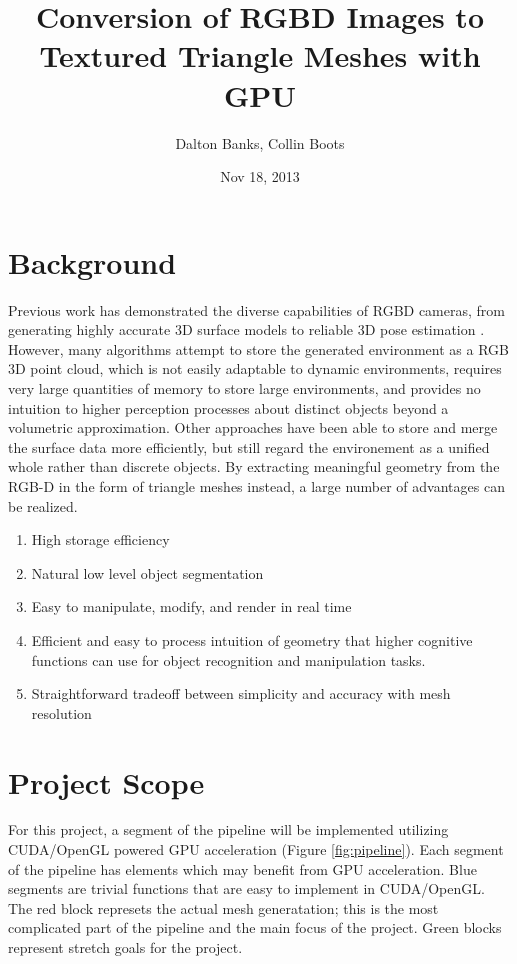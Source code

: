 \documentclass[letterpaper, 10 pt, conference]{ieeeconf}
\title{Conversion of RGBD Images to Textured Triangle Meshes with GPU}
\author{Dalton Banks, Collin Boots}
\date{Nov 18, 2013}
\begin{document}
   \maketitle


\section{Background} 
Previous work has demonstrated the diverse capabilities of RGBD cameras, from generating highly accurate 3D surface models \cite{KinectFusion} to reliable 3D pose estimation \cite{Endres,Taguchi}. However, many algorithms attempt to store the generated environment as a RGB 3D point cloud, which is not easily adaptable to dynamic environments, requires very large quantities of memory to store large environments, and provides no intuition to higher perception processes about distinct objects beyond a volumetric approximation. Other approaches have been able to store and merge the surface data more efficiently, but still regard the environement as a unified whole rather than discrete objects. By extracting meaningful geometry from the RGB-D in the form of triangle meshes instead, a large number of advantages can be realized.

\begin{enumerate}
\item High storage efficiency
\item Natural low level object segmentation
\item Easy to manipulate, modify, and render in real time
\item Efficient and easy to process intuition of geometry that higher cognitive functions can use for object recognition and manipulation tasks.
\item Straightforward tradeoff between simplicity and accuracy with mesh resolution
\end{enumerate}

\section{Project Scope}
For this project, a segment of the pipeline will be implemented utilizing CUDA/OpenGL powered GPU acceleration (Figure \ref{fig:pipeline}).  Each segment of the pipeline has elements which may benefit from GPU acceleration. Blue segments are trivial functions that are easy to implement in CUDA/OpenGL. The red block represets the actual mesh generatation; this is the most complicated part of the pipeline and the main focus of the project. Green blocks represent stretch goals for the project.
\end{document}
